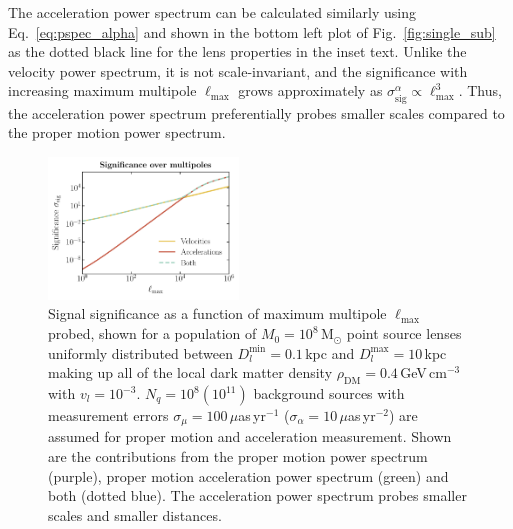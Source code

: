 \documentclass[prd,aps,10pt,nofootinbib,twocolumn,superscriptaddress,preprintnumbers,balancelastpage,longbibliography]{revtex4-1}
\begin{document}
The acceleration power spectrum can be calculated similarly using Eq.~\ref{eq:pspec_alpha} and shown in the bottom left plot of Fig.~\ref{fig:single_sub} as the dotted black line for the lens properties in the inset text. Unlike the velocity power spectrum, it is not scale-invariant, and the significance with increasing maximum multipole $\ell_\mathrm{max}$ grows approximately as $\sigma_\mathrm{sig}^\alpha\propto\ell_\mathrm{max}^3$. Thus, the acceleration power spectrum preferentially probes smaller scales compared to the proper motion power spectrum. 

\begin{figure}[htbp]
  \centering
  \includegraphics[width=0.45\textwidth]{plots/mualpha_compact}
  \caption{Signal significance as a function of maximum multipole $\ell_\mathrm{max}$ probed, shown for a population of $M_0=10^8$\,M$_\odot$ point source lenses uniformly distributed between $D_l^{\mathrm{min}}=0.1$\,kpc and $D_l^{\mathrm{max}}=10$\,kpc making up all of the local dark matter density $\rho_\mathrm{DM}=0.4$\,GeV\,cm$^{-3}$ with $v_l=10^{-3}$. $N_q=10^8 (10^{11})$ background sources with measurement errors $\sigma_\mu=100\,\mu$as\,yr$^{-1}$ ($\sigma_\alpha=10\,\mu$as\,yr$^{-2}$) are assumed for proper motion and acceleration measurement. Shown are the contributions from the proper motion power spectrum (purple), proper motion acceleration power spectrum (green) and both (dotted blue). The acceleration power spectrum probes smaller scales and smaller distances.} 
  \label{fig:mualpha_compact}
\end{figure}
\end{document}
